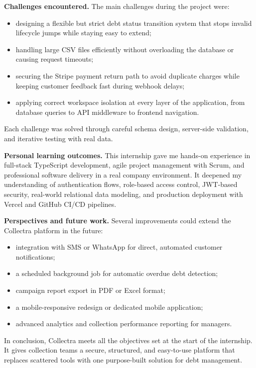 \documentclass[12pt,a4paper]{report}
\begin{document}
\textbf{Challenges encountered.}
The main challenges during the project were:
\begin{itemize}
  \item designing a flexible but strict debt status transition system that stops
        invalid lifecycle jumps while staying easy to extend;
  \item handling large CSV files efficiently without overloading the database or
        causing request timeouts;
  \item securing the Stripe payment return path to avoid duplicate charges while
        keeping customer feedback fast during webhook delays;
  \item applying correct workspace isolation at every layer of the application,
        from database queries to API middleware to frontend navigation.
\end{itemize}
Each challenge was solved through careful schema design, server-side validation,
and iterative testing with real data.

\textbf{Personal learning outcomes.}
This internship gave me hands-on experience in full-stack TypeScript development,
agile project management with Scrum, and professional software delivery in a real
company environment.
It deepened my understanding of authentication flows, role-based access control,
JWT-based security, real-world relational data modeling, and production deployment
with Vercel and GitHub CI/CD pipelines.

\textbf{Perspectives and future work.}
Several improvements could extend the Collectra platform in the future:
\begin{itemize}
  \item integration with SMS or WhatsApp for direct, automated customer
        notifications;
  \item a scheduled background job for automatic overdue debt detection;
  \item campaign report export in PDF or Excel format;
  \item a mobile-responsive redesign or dedicated mobile application;
  \item advanced analytics and collection performance reporting for managers.
\end{itemize}

In conclusion, Collectra meets all the objectives set at the start of the
internship.
It gives collection teams a secure, structured, and easy-to-use platform that
replaces scattered tools with one purpose-built solution for debt management.
\end{document}
